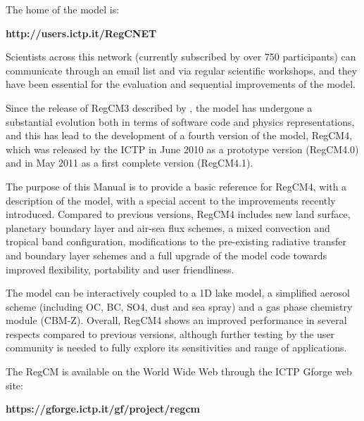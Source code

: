 The home of the model is:

\begin{center}
{\bf http://users.ictp.it/RegCNET}
\end{center}

Scientists across this network (currently subscribed by over 750 participants)
can communicate through an email list and via regular scientific workshops,
and they have been essential for the evaluation and sequential improvements of
the model.

Since the release of \ac{RegCM}3 described by \cite{Pal_07}, the model has undergone
a substantial evolution both in terms of software code and physics
representations, and this has lead to the development of a fourth version of
the model, \ac{RegCM}4, which was released by the ICTP in June 2010 as a prototype
version (\ac{RegCM}4.0) and in May 2011 as a first complete version (\ac{RegCM}4.1).

The purpose of this Manual is to provide a basic reference for \ac{RegCM}4, with
a description of the model, with a special accent to the improvements
recently introduced.
Compared to previous versions, \ac{RegCM}4 includes new land surface, planetary
boundary layer and air-sea flux schemes, a mixed convection and tropical band
configuration, modifications to the pre-existing radiative transfer and
boundary layer schemes and a full upgrade of the model code towards improved
flexibility, portability and user friendliness.

The model can be interactively coupled to a 1D lake model, a simplified aerosol
scheme (including OC, BC, SO4, dust and sea spray) and a gas phase chemistry
module (CBM-Z). Overall, \ac{RegCM}4 shows an improved performance in several
respects compared to previous versions, although further testing by the user
community is needed to fully explore its sensitivities and range of
applications.

The \ac{RegCM} is available on the World Wide Web through the ICTP Gforge
web site:

\begin{center}
  {\bf https://gforge.ictp.it/gf/project/regcm }
\end{center}
